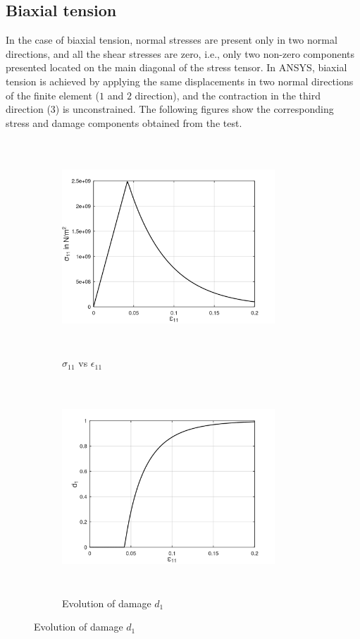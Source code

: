 \documentclass[12pt,a4paper,twoside,openright]{report}
\begin{document}
\subsection{Biaxial tension}
\indent\indent\indent  In the case of biaxial tension, normal stresses are present only in two normal directions, and all the shear stresses are zero, i.e., only two non-zero components presented located on the main diagonal of the stress tensor. In ANSYS, biaxial tension is achieved by applying the same displacements in two normal directions of the finite element ($1$ and $2$ direction), and the contraction in the third direction ($3$) is unconstrained. The following figures show the corresponding stress and damage components obtained from the test.\\
\begin{figure}[hbt!]
     \captionsetup[subfigure]{justification=centering}
     \begin{subfigure}{0.4\textwidth}
         \includegraphics[width=8cm,height=8cm,keepaspectratio]{23.S11vsE11.png}
         \caption{$\sigma_{11}$ vs $\epsilon_{11}$}
         \label{fig:S11vsE11}
     \end{subfigure}
	\hspace{1.5cm}
     \captionsetup[subfigure]{justification=centering}
     \begin{subfigure}{0.4\textwidth}
         \includegraphics[width=8cm,height=8cm,keepaspectratio]{23.d1.png}
         \caption{Evolution of damage $d_{1}$}
         \label{fig:Evolution of damage d1}
     \end{subfigure}
\end{figure}
\end{document}
